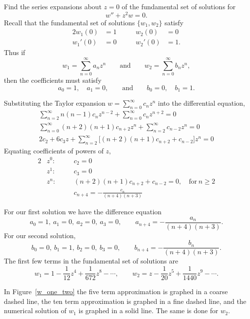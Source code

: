 \begin{Example}
  Find the series expansions about $z=0$ of the fundamental set of solutions
  for
  \[ w'' +z^2 w = 0. \]
  Recall that the fundamental set of solutions $\{w_1, w_2\}$ satisfy
  \begin{alignat*}{2}
    w_1(0) &= 1 &\qquad w_2(0) &= 0 \\
    w_1'(0) &= 0 & \qquad w_2'(0) &= 1.
  \end{alignat*}
  Thus if
  \[ w_1 = \sum_{n=0}^\infty a_n z^n \qquad \mathrm{and} \qquad
  w_2 = \sum_{n=0}^\infty b_n z^n,\]
  then the coefficients must satisfy
  \[ a_0 = 1, \quad a_1 = 0, \qquad \mathrm{and} \qquad b_0=0, \quad b_1=1.\]

  Substituting the Taylor expansion $w = \sum_{n=0}^\infty c_n z^n$ into
  the differential equation,
  \begin{gather*}
    \sum_{n=2}^\infty n(n-1)c_n z^{n-2} + \sum_{n=0}^\infty c_n z^{n+2} = 0 \\
    \sum_{n=0}^\infty (n+2)(n+1) c_{n+2} z^n + \sum_{n=2}^\infty c_{n-2}z^n = 0 \\
    2c_2 + 6 c_3 z + \sum_{n=2}^\infty \Big[(n+2)(n+1)c_{n+2} + c_{n-2}\Big]z^n = 0
  \end{gather*}
  Equating coefficients of powers of $z$,
  \begin{alignat*}{2}
    &z^0: & \quad &c_2 = 0 \\
    &z^1: &\quad &c_3 = 0 \\
    &z^n: &\quad &(n+2)(n+1)c_{n+2} + c_{n-2} = 0, 
    \quad \mathrm{for}\ n \geq 2 \\
    &       &    &c_{n+4} = -\frac{c_n}{(n+4)(n+3)}
  \end{alignat*}

  For our first solution we have the difference equation
  \[ a_0 = 1,\ a_1 = 0,\ a_2 = 0,\ a_3 = 0, \qquad 
  a_{n+4} = -\frac{a_n}{(n+4)(n+3)}.\]
  For our second solution,
  \[ b_0 = 0,\ b_1 = 1,\ b_2 = 0,\ b_3 = 0, \qquad 
  b_{n+4} = -\frac{b_n}{(n+4)(n+3)}.\]
  The first few terms in the fundamental set of solutions are
  \[
  \boxed{
    w_1 = 1 - \frac{1}{12} z^4 + \frac{1}{672} z^8 - \cdots, \qquad 
    w_2 = z - \frac{1}{20} z^5 + \frac{1}{1440} z^9 - \cdots.
    }
  \]

  In Figure~\ref{w_one_two} the five term approximation is graphed
  in a coarse dashed line, the ten term approximation is graphed
  in a fine dashed line, and the numerical solution of $w_1$ is graphed in 
  a solid line.
  The same is done for $w_2$.


\end{Example}
